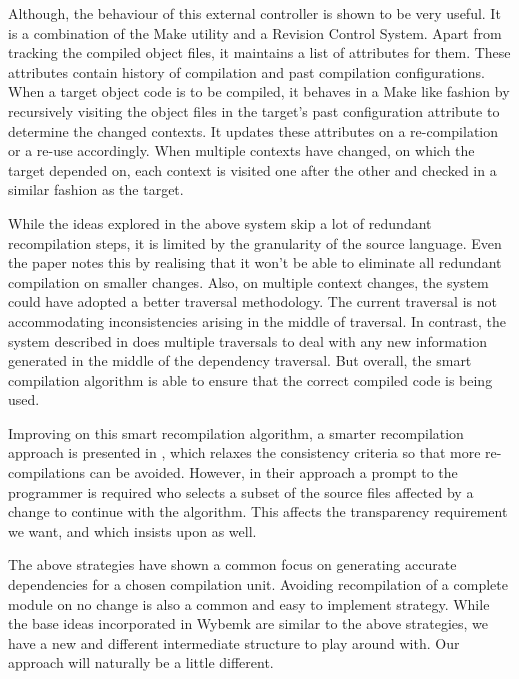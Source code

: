 Although, the behaviour of this external controller is shown to be very
useful. It is a combination of the Make utility and a Revision Control
System. Apart from tracking the compiled object files, it maintains a list of
attributes for them. These attributes contain history of compilation and past
compilation configurations. When a target object code is to be compiled, it
behaves in a Make like fashion by recursively visiting the object files in the
target's past configuration attribute to determine the changed contexts. It
updates these attributes on a re-compilation or a re-use accordingly. When
multiple contexts have changed, on which the target depended on, each context
is visited one after the other and checked in a similar fashion as the target. 

While the ideas explored in the above system skip a lot of redundant
recompilation steps, it is limited by the granularity of the source
language. Even the paper notes this by realising that it won't be able to
eliminate all redundant compilation on smaller changes. Also, on multiple
context changes, the system could have adopted a better traversal methodology.
The current traversal is not accommodating inconsistencies arising in the
middle of traversal. In contrast, the system described in \citep{cpp_compiler}
does multiple traversals to deal with any new information generated in the
middle of the dependency traversal. But overall, the smart compilation
algorithm is able to ensure that the correct compiled code is being used.

Improving on this smart recompilation algorithm, a smarter recompilation
approach is presented in \citep{smarter_recompilation}, which relaxes the
consistency criteria so that more re-compilations can be avoided. However, in
their approach a prompt to the programmer is required who selects a subset of
the source files affected by a change to continue with the algorithm. This
affects the transparency requirement we want, and which \cite{cpp_compiler}
insists upon as well.

The above strategies have shown a common focus on generating accurate
dependencies for a chosen compilation unit. Avoiding recompilation of a
complete module on no change is also a common and easy to implement
strategy. While the base ideas incorporated in Wybemk are similar to the above
strategies, we have a new and different intermediate structure to play around
with. Our approach will naturally be a little different.


